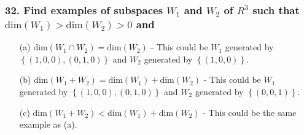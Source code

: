 \documentclass{article}
\begin{document}
\subsubsection*{32. Find examples of subspaces $W_1$ and $W_2$ of $R^3$ such that $\text{dim}(W_1) > \text{dim}(W_2) > 0$ and}
\begin{enumerate}
	\item[(a)] $\text{dim}(W_1 \cap W_2) = \text{dim}(W_2)$ - This could be $W_1$ generated by $\left\{(1, 0, 0), (0, 1, 0)\right\}$ and $W_2$ generated by $\left\{(1, 0, 0)\right\}$.
	\item[(b)] $\text{dim}(W_1 + W_2) = \text{dim}(W_1) + \text{dim}(W_2)$ - This could be $W_1$ generated by $\left\{(1, 0, 0), (0, 1, 0)\right\}$ and $W_2$ generated by $\left\{(0, 0, 1)\right\}$.
	\item[(c)] $\text{dim}(W_1 + W_2) < \text{dim}(W_1) + \text{dim}(W_2)$ - This could be the same example as (a).
\end{enumerate}
\end{document}
